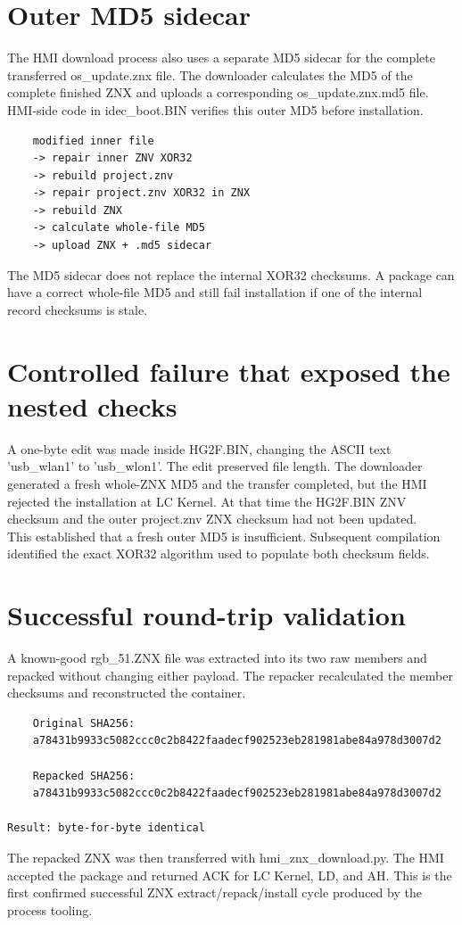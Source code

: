 \documentclass[]{article}
\begin{document}
\section{Outer MD5 sidecar}
The HMI download process also uses a separate MD5 sidecar for the complete transferred os\_update.znx file. The downloader calculates the MD5 of the complete finished ZNX and uploads a corresponding os\_update.znx.md5 file. HMI-side code in idec\_boot.BIN verifies this outer MD5 before installation.
\begin{verbatim}
	modified inner file
	-> repair inner ZNV XOR32
	-> rebuild project.znv
	-> repair project.znv XOR32 in ZNX
	-> rebuild ZNX
	-> calculate whole-file MD5
	-> upload ZNX + .md5 sidecar
\end{verbatim}
The MD5 sidecar does not replace the internal XOR32 checksums. A package can have a correct whole-file MD5 and still fail installation if one of the internal record checksums is stale.

\section{Controlled failure that exposed the nested checks}
A one-byte edit was made inside HG2F.BIN, changing the ASCII text 'usb\_wlan1' to 'usb\_wlon1'. The edit preserved file length. The downloader generated a fresh whole-ZNX MD5 and the transfer completed, but the HMI rejected the installation at LC Kernel. At that time the HG2F.BIN ZNV checksum and the outer project.znv ZNX checksum had not been updated.\\
This established that a fresh outer MD5 is insufficient. Subsequent compilation identified the exact XOR32 algorithm used to populate both checksum fields.


\section{Successful round-trip validation}
A known-good rgb\_51.ZNX file was extracted into its two raw members and repacked without changing either payload. The repacker recalculated the member checksums and reconstructed the container.

\begin{verbatim}
    Original SHA256:
    a78431b9933c5082ccc0c2b8422faadecf902523eb281981abe84a978d3007d2

    Repacked SHA256:
    a78431b9933c5082ccc0c2b8422faadecf902523eb281981abe84a978d3007d2

Result: byte-for-byte identical
\end{verbatim}
The repacked ZNX was then transferred with hmi\_znx\_download.py. The HMI accepted the package and returned ACK for LC Kernel, LD, and AH. This is the first confirmed successful ZNX extract/repack/install cycle produced by the process tooling.
\end{document}
